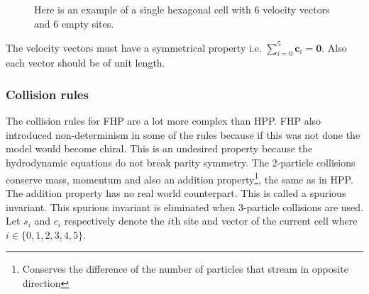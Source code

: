 \documentclass[a4paper,10pt]{article}
\begin{document}
\begin{figure}[H]
  \caption{Here is an example of a single hexagonal cell with 6 velocity vectors and 6 empty sites.}
  \label{figure:Hsingle-cell}
\end{figure}
\noindent The velocity vectors must have a symmetrical property i.e. $\sum_{i = 0}^{5} \textbf{c}_{i} = \textbf{0}$. Also each vector should be of unit length.
\subsubsection{Collision rules}
The collision rules for FHP are a lot more complex than HPP. FHP also introduced non-determinism in some of the rules because if this was not done the model would become chiral. This is an undesired property because the hydrodynamic equations do not break parity symmetry.
The 2-particle collisions conserve mass, momentum and also an addition property\footnote{Conserves the difference of the number of particles that stream in opposite direction}, the same as in HPP. The addition property has no real world counterpart. This is called a spurious invariant. This spurious invariant is eliminated when 3-particle collisions
are used. Let $s_{i}$ and $c_{i}$ respectively denote the $i$th site and vector of the current cell where $i \in \{0, 1, 2, 3, 4, 5\}$. 
\end{document}
